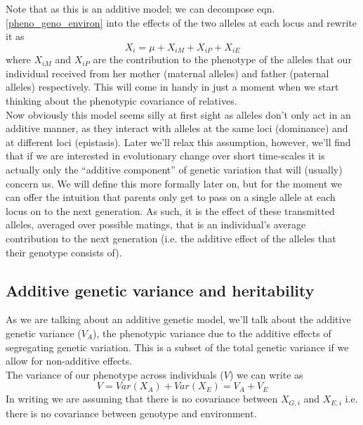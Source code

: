 Note that as this is an additive model; we can decompose eqn. \ref{pheno_geno_environ} into the
effects of the two alleles at each locus and rewrite
it as
\begin{equation}
X_i = \mu + X_{iM}+X_{iP} +X_{iE}
\end{equation}
where $X_{iM}$ and $X_{iP}$ are the contribution to the phenotype of
the alleles that our individual received from her mother (maternal
alleles) and father (paternal alleles) respectively. This will come in
handy in just a moment when we start thinking about the phenotypic covariance of relatives.\\

Now obviously this model seems silly at first sight as alleles don't only act in an additive manner, as they interact with alleles at the same loci (dominance) and at different loci (epistasis). Later we'll relax this assumption, 
however, we'll find that if we are interested in evolutionary change over short time-scales it is actually only the ``additive
component'' of genetic variation that will (usually) concern us. 
We will define this more formally later on, but for the moment 
we can offer the intuition that parents only get to pass on a single allele at each locus on to the next generation. As such, it is the effect of these transmitted alleles, averaged over possible matings, that is an individual's average contribution  to the next generation (i.e. the additive effect of the alleles that their genotype consists of).



\subsection{Additive genetic variance and heritability}
As we are talking about an additive genetic model, we'll talk about the additive genetic variance ($V_A$), the phenotypic variance due to the additive effects of segregating genetic variation. This is a subset of the total genetic
variance if we allow for non-additive effects. \\

The variance of our phenotype across individuals ($V$) we can write as
\begin{equation}
V = Var(X_A) + Var(X_E) = V_A+V_E
\end{equation}
In writing  we are assuming that there is no covariance between $X_{G,i}$ and $X_{E,i}$ i.e. there is no covariance between genotype and environment. \\

